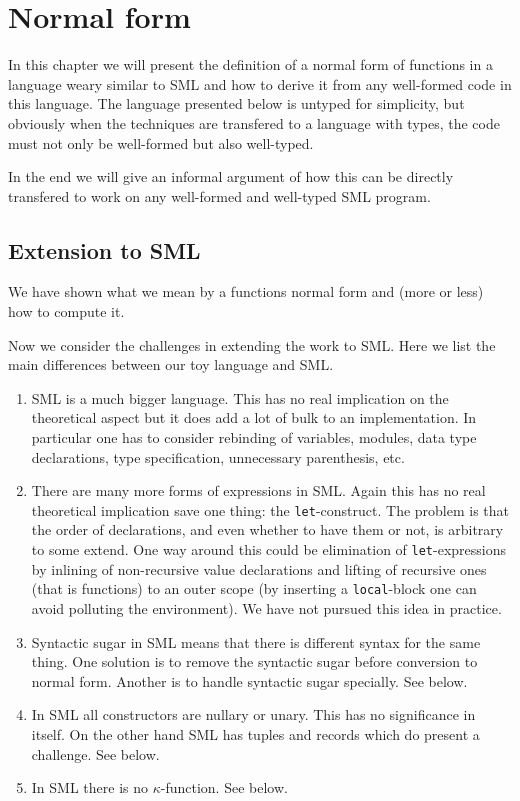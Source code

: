 \chapter{Normal form}\label{chap:normal-form}
In this chapter we will present the definition of a normal form of functions in
a language weary similar to SML and how to derive it from any well-formed code
in this language. The language presented below is untyped for simplicity, but
obviously when the techniques are transfered to a language with types, the code
must not only be well-formed but also well-typed.

In the end we will give an informal argument of how this can be directly
transfered to work on any well-formed and well-typed SML program.



\section{Extension to SML}

We have shown what we mean by a functions normal form and (more or less) how
to compute it.

Now we consider the challenges in extending the work to SML. Here we list the
main differences between our toy language and SML.

\begin{enumerate}
\item SML is a much bigger language. This has no real implication on the
  theoretical aspect but it does add a lot of bulk to an implementation. In
  particular one has to consider rebinding of variables, modules, data type
  declarations, type specification, unnecessary parenthesis, etc.
\item There are many more forms of expressions in SML. Again this has no real
  theoretical implication save one thing: the \texttt{let}-construct. The
  problem is that the order of declarations, and even whether to have them or
  not, is arbitrary to some extend. One way around this could be elimination of
  \texttt{let}-expressions by inlining of non-recursive value declarations and
  lifting of recursive ones (that is functions) to an outer scope (by inserting
  a \texttt{local}-block one can avoid polluting the environment). We have not
  pursued this idea in practice.
\item Syntactic sugar in SML means that there is different syntax for the same
  thing. One solution is to remove the syntactic sugar before conversion to
  normal form. Another is to handle syntactic sugar specially. See
   below.
\item In SML all constructors are nullary or unary. This has no significance in
  itself. On the other hand SML has tuples and records which do present a
  challenge. See  below.
\item In SML there is no $\kappa$-function. See 
  below.
\end{enumerate}

